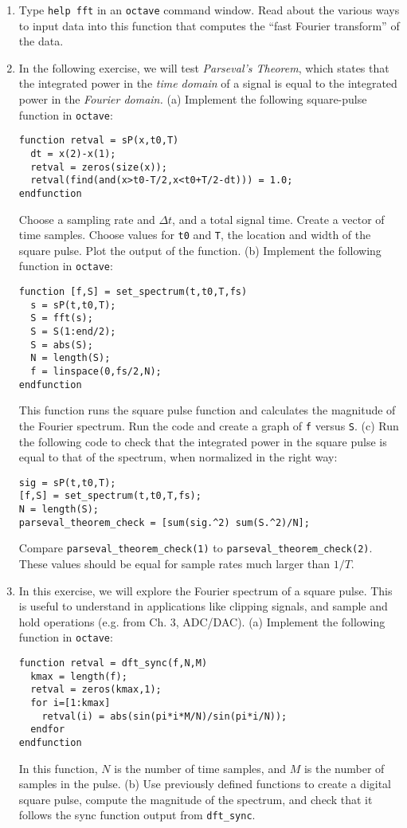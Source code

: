 \documentclass{article}
\begin{document}
\begin{enumerate}
\item Type \verb+help fft+ in an \verb+octave+ command window.  Read about the various ways to input data into this function that computes the ``fast Fourier transform'' of the data.
\item In the following exercise, we will test \textit{Parseval's Theorem}, which states that the integrated power in the \textit{time domain} of a signal is equal to the integrated power in the \textit{Fourier domain.} (a) Implement the following square-pulse function in \verb+octave+:
\begin{verbatim}
function retval = sP(x,t0,T)
  dt = x(2)-x(1);
  retval = zeros(size(x));
  retval(find(and(x>t0-T/2,x<t0+T/2-dt))) = 1.0;
endfunction
\end{verbatim}
Choose a sampling rate and $\Delta t$, and a total signal time.  Create a vector of time samples.  Choose values for \verb+t0+ and \verb+T+, the location and width of the square pulse.  Plot the output of the function. (b) Implement the following function in \verb+octave+:
\begin{verbatim}
function [f,S] = set_spectrum(t,t0,T,fs)
  s = sP(t,t0,T);
  S = fft(s);
  S = S(1:end/2);
  S = abs(S);
  N = length(S);
  f = linspace(0,fs/2,N);
endfunction
\end{verbatim}
This function runs the square pulse function and calculates the magnitude of the Fourier spectrum.  Run the code and create a graph of \verb+f+ versus \verb+S+. (c) Run the following code to check that the integrated power in the square pulse is equal to that of the spectrum, when normalized in the right way:
\begin{verbatim}
sig = sP(t,t0,T);
[f,S] = set_spectrum(t,t0,T,fs);
N = length(S);
parseval_theorem_check = [sum(sig.^2) sum(S.^2)/N];
\end{verbatim}
Compare \verb+parseval_theorem_check(1)+ to \verb+parseval_theorem_check(2)+.  These values should be equal for sample rates much larger than $1/T$.
\item In this exercise, we will explore the Fourier spectrum of a square pulse.  This is useful to understand in applications like clipping signals, and sample and hold operations (e.g. from Ch. 3, ADC/DAC). (a) Implement the following function in \verb+octave+:
\begin{verbatim}
function retval = dft_sync(f,N,M)
  kmax = length(f);
  retval = zeros(kmax,1);
  for i=[1:kmax]
    retval(i) = abs(sin(pi*i*M/N)/sin(pi*i/N));
  endfor
endfunction
\end{verbatim}
In this function, $N$ is the number of time samples, and $M$ is the number of samples in the pulse. (b) Use previously defined functions to create a digital square pulse, compute the magnitude of the spectrum, and check that it follows the sync function output from \verb+dft_sync+.
\end{enumerate}
\end{document}
